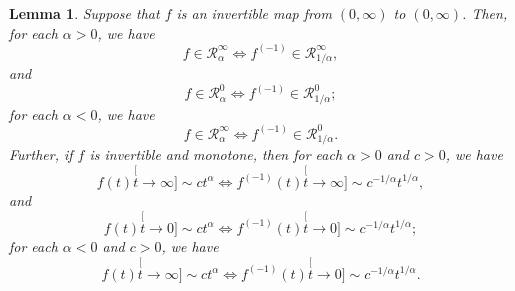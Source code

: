 \documentclass[12pt, a4paper]{amsart}
\newtheorem{lem}[thm]{Lemma}
\theoremstyle{definition}
\numberwithin{equation}{section}
\begin{document}
\begin{lem}
\label{lem: regularly variation and inverse}
	Suppose that $f$ is an invertible map from $(0,\infty)$ to $(0,\infty)$. Then, for each $\alpha > 0$, we have
\[ \label{eq: inverse of a regularly varying function at infinity with alpha > 0}
	f
	\in \mathcal R^\infty_{\alpha}
	\iff f^{(-1)}
	\in \mathcal R^\infty_{1/\alpha},
\] 
	and
\[ \label{eq: inverse of a regularly varying function at 0 with alpha > 0}
	f
	\in \mathcal R^0_{\alpha}
	\iff f^{(-1)}
	\in \mathcal R^0_{1/\alpha};
\] 
	for each $\alpha < 0$, we have
\[ \label{eq: inverse of a regularly varying function with alpha < 0}
	f
	\in \mathcal R^\infty_{\alpha}
	\iff f^{(-1)}
	\in \mathcal R^0_{1/\alpha}.
\] 
	Further, if $f$ is invertible and monotone, then for each $\alpha > 0$ and $c > 0$, we have
\[\label{eq: inverse and power equivalent at infinity with alpha > 0}
	f(t)
	\stackrel[t\to \infty]{}{\sim} c t^\alpha 
	\iff f^{(-1)}(t)
	\stackrel[t\to \infty]{}{\sim} c^{-1/\alpha} t^{1/\alpha},
\]
	and
\[\label{eq: inverse and power equivalent at 0 with alpha > 0}
	f(t)
	\stackrel[t\to 0]{}{\sim} c t^\alpha 
	\iff f^{(-1)}(t)
	\stackrel[t\to 0]{}{\sim} c^{-1/\alpha} t^{1/\alpha};
\]
	for each $\alpha < 0$ and $c > 0$, we have
\[\label{eq: inverse and power equivalent with alpha < 0}
	f(t)
	\stackrel[t\to \infty]{}{\sim} c t^\alpha 
	\iff f^{(-1)}(t)
	\stackrel[t\to 0]{}{\sim} c^{-1/\alpha} t^{1/\alpha}. 
\]
\end{lem}
\end{document}
